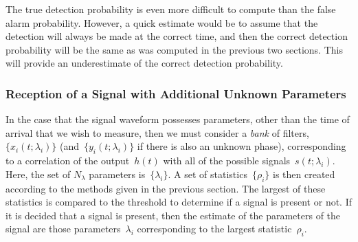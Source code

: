 The true detection probability is even more difficult to compute than
the false alarm probability.  However, a quick estimate would be to
assume that the detection will always be made at the correct time, and
then the correct detection probability will be the same as was computed
in the previous two sections.  This will provide an underestimate of the
correct detection probability.

\subsubsection{Reception of a Signal with Additional Unknown Parameters}

In the case that the signal waveform possesses parameters, other than
the time of arrival that we wish to measure, then we must consider
a \emph{bank} of filters, $\{x_i(t;\lambda_i)\}$
(and~$\{y_i(t;\lambda_i)\}$ if there is
also an unknown phase), corresponding to a correlation of the
output~$h(t)$ with all of the possible signals~$s(t;\lambda_i)$.
Here, the set of $N_\lambda$ parameters is~$\{\lambda_i\}$.
A set of statistics~$\{\rho_i\}$ is then created according to the
methods given in the previous section.  The largest of these statistics
is compared to the threshold to determine if a signal is present or
not.  If it is decided that a signal is present, then the estimate
of the parameters of the signal are those parameters~$\lambda_i$
corresponding to the largest statistic~$\rho_i$.

